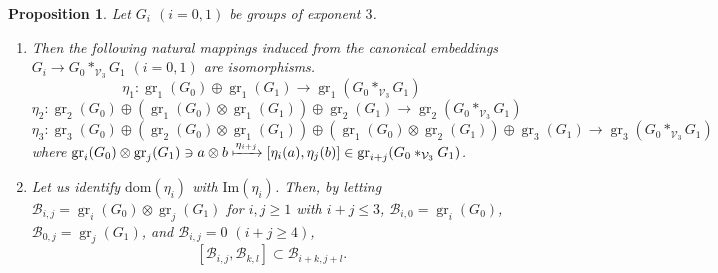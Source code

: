 \documentclass[11pt,reqno]{article}
\newtheorem{proposition}[theorem]{Proposition}
\theoremstyle{definition}
\theoremstyle{remark}
\DeclareMathOperator{\gr}{gr}
\begin{document}
\begin{proposition}\label{proposition:gr of free product}
    Let $G_i$ $(i=0,1)$ be groups of exponent $3$.
    \begin{enumerate}
        \item Then the following natural mappings induced from the canonical embeddings $G_i\to G_0*_{\mathcal V_3}G_1$ $(i=0,1)$ are isomorphisms.
        \[
        \eta_1:\gr_1(G_0)\oplus \gr_1(G_1) \to \gr_1(G_0*_{\mathcal V_3}G_1)
        \]
        \[
        \eta_2:\gr_2(G_0)\oplus (\gr_1(G_0)\otimes\gr_1(G_1))\oplus \gr_2(G_1) \to \gr_2(G_0*_{\mathcal V_3}G_1)
        \]
        \[
        \eta_3:\gr_3(G_0)\oplus (\gr_2(G_0)\otimes\gr_1(G_1))\oplus (\gr_1(G_0)\otimes\gr_2(G_1)) \oplus \gr_3(G_1) \to \gr_3(G_0*_{\mathcal V_3}G_1)    
        \]
        where $\gr_i(G_0)\otimes \gr_j(G_1)\ni a\otimes b \xmapsto{\eta_{i+j}} [\eta_i(a),\eta_j(b)]\in \gr_{i+j}(G_0*_{\mathcal V_3}G_1)$. 

        \item Let us identify $\mathrm{dom}(\eta_i)$ with $\mathrm{Im}(\eta_i)$. Then, by letting $\mathcal B_{i,j}=\gr_i(G_0)\otimes \gr_j(G_1)$ for $i,j\geq 1$ with $i+j\leq 3$, $\mathcal B_{i,0}=\gr_i(G_0)$,  $\mathcal B_{0,j}=\gr_j(G_1)$, and
        $\mathcal B_{i,j}=0$ $(i+j\geq 4)$,
        \[
            [\mathcal B_{i,j},\mathcal B_{k,l}]\subset \mathcal B_{i+k,j+l}.
            \]
    \end{enumerate}    
\end{proposition}
\end{document}
